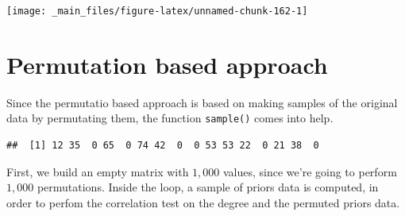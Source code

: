 \documentclass[
  notitlepage,
  onecolumn,
  openany]{book}
\newenvironment{Shaded}{\begin{snugshade}}{\end{snugshade}}
\newcommand{\AttributeTok}[1]{\textcolor[rgb]{0.77,0.63,0.00}{#1}}
\newcommand{\CommentTok}[1]{\textcolor[rgb]{0.56,0.35,0.01}{\textit{#1}}}
\newcommand{\DocumentationTok}[1]{\textcolor[rgb]{0.56,0.35,0.01}{\textbf{\textit{#1}}}}
\newcommand{\FunctionTok}[1]{\textcolor[rgb]{0.00,0.00,0.00}{#1}}
\newcommand{\NormalTok}[1]{#1}
\newcommand{\OtherTok}[1]{\textcolor[rgb]{0.56,0.35,0.01}{#1}}
\newcommand{\SpecialCharTok}[1]{\textcolor[rgb]{0.00,0.00,0.00}{#1}}
\begin{document}
\begin{Shaded}
\end{Shaded}

\begin{center}\texttt{[image: \_main\_files/figure-latex/unnamed-chunk-162-1]} \end{center}

\hypertarget{permutation-based-approach-1}{%
\section{Permutation based approach}\label{permutation-based-approach-1}}

Since the permutatio based approach is based on making samples of the original data by permutating them, the function \texttt{sample()} comes into help.

\begin{Shaded}
\end{Shaded}

\begin{verbatim}
##  [1] 12 35  0 65  0 74 42  0  0 53 53 22  0 21 38  0
\end{verbatim}

First, we build an empty matrix with \(1,000\) values, since we're going to perform \(1,000\) permutations. Inside the loop, a sample of priors data is computed, in order to perfom the correlation test on the degree and the permuted priors data.
\end{document}
